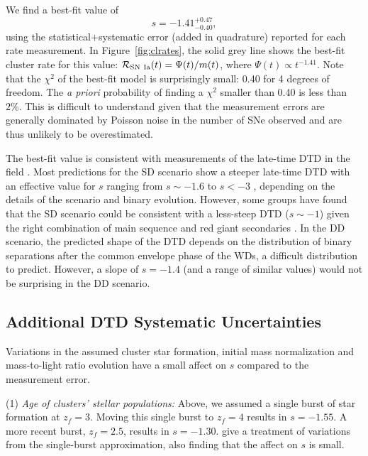 We find a best-fit value of
\begin{equation}
s = -1.41^{+0.47}_{-0.40},
\end{equation}
using the statistical$+$systematic error (added in quadrature)
reported for each rate measurement. In Figure~\ref{fig:clrates}, the
solid grey line shows the best-fit cluster rate for this value:
$\mathcal{R}_{\rm SN~Ia}(t)=\Psi(t)/m(t)$, where $\Psi(t) \propto
t^{-1.41}$. Note that the $\chi^2$ of the best-fit model is
surprisingly small: 0.40 for 4 degrees of freedom. The \emph{a priori}
probability of finding a $\chi^2$ smaller than 0.40 is less than
$2\%$. This is difficult to understand given that the measurement
errors are generally dominated by Poisson noise in the number of SNe
observed and are thus unlikely to be overestimated.

The best-fit value is consistent with measurements of the late-time DTD in
the field \citep{totani08a}. Most predictions for the SD scenario show
a steeper late-time DTD \citep{greggio05a,ruiter09a,mennekens10a} with
an effective value for $s$ ranging from $s \sim -1.6$
\citep{greggio05a} to $s < -3$ \citep{mennekens10a}, depending on the
details of the scenario and binary evolution. However, some groups
have found that the SD scenario could be consistent with a less-steep
DTD ($s \sim -1$) given the right combination of main sequence and red
giant secondaries \citep{hachisu08a}.  In the DD scenario, the
predicted shape of the DTD depends on the distribution of binary
separations after the common envelope phase of the WDs, a difficult
distribution to predict. However, a slope of $s = -1.4$ (and a range
of similar values) would not be surprising in the DD scenario.

\subsection{Additional DTD Systematic Uncertainties} \label{conclusionssys}

Variations in the assumed cluster star formation, initial mass
normalization and mass-to-light ratio evolution have a small affect on $s$
compared to the measurement error.

(1) \emph{Age of clusters' stellar populations:} Above, we assumed a
single burst of star formation at $z_f = 3$. Moving this single burst
to $z_f = 4$ results in $s = -1.55$. A more recent burst, $z_f = 2.5$,
results in $s = -1.30$.  \citet{maoz10c} give a treatment of variations from
the single-burst approximation, also finding that the affect on $s$ is
small.


